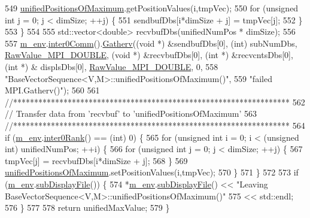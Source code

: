 \begin{DoxyCode}
549     \hyperlink{class_q_u_e_s_o_1_1_base_vector_sequence_a4269482101b2bcdb1975543f8191ab4c}{unifiedPositionsOfMaximum}.getPositionValues(i,tmpVec);
550     \textcolor{keywordflow}{for} (\textcolor{keywordtype}{unsigned} \textcolor{keywordtype}{int} j = 0; j < dimSize; ++j) \{
551       sendbufDbs[i*dimSize + j] = tmpVec[j];
552     \}
553   \}
554 
555   std::vector<double> recvbufDbs(unifiedNumPos * dimSize);
556 
557   \hyperlink{class_q_u_e_s_o_1_1_base_vector_sequence_a8e8824d2a63c5a43bcc6473e3a0491e8}{m\_env}.\hyperlink{class_q_u_e_s_o_1_1_base_environment_a689e4d140c74d495d97eb498714a4b82}{inter0Comm}().\hyperlink{class_q_u_e_s_o_1_1_mpi_comm_a9313449240c1bb2289870309a5c711ed}{Gatherv}((\textcolor{keywordtype}{void} *) &sendbufDbs[0], (\textcolor{keywordtype}{int}) subNumDbs, 
      \hyperlink{_mpi_comm_8h_ad0f503bd9fecfe4e570ca3d15aaf2518}{RawValue\_MPI\_DOUBLE}, (\textcolor{keywordtype}{void} *) &recvbufDbs[0], (\textcolor{keywordtype}{int} *) &recvcntsDbs[0], (\textcolor{keywordtype}{int} *) &
      displsDbs[0], \hyperlink{_mpi_comm_8h_ad0f503bd9fecfe4e570ca3d15aaf2518}{RawValue\_MPI\_DOUBLE}, 0,
558                              \textcolor{stringliteral}{"BaseVectorSequence<V,M>::unifiedPositionsOfMaximum()"},
559                              \textcolor{stringliteral}{"failed MPI.Gatherv()"});
560 
561   \textcolor{comment}{//******************************************************************}
562   \textcolor{comment}{// Transfer data from 'recvbuf' to 'unifiedPositionsOfMaximum'}
563   \textcolor{comment}{//******************************************************************}
564   \textcolor{keywordflow}{if} (\hyperlink{class_q_u_e_s_o_1_1_base_vector_sequence_a8e8824d2a63c5a43bcc6473e3a0491e8}{m\_env}.\hyperlink{class_q_u_e_s_o_1_1_base_environment_ae106b5bb8a80b655b88b3a26b1e7c185}{inter0Rank}() == (int) 0) \{
565     \textcolor{keywordflow}{for} (\textcolor{keywordtype}{unsigned} \textcolor{keywordtype}{int} i = 0; i < (\textcolor{keywordtype}{unsigned} int) unifiedNumPos; ++i) \{
566       \textcolor{keywordflow}{for} (\textcolor{keywordtype}{unsigned} \textcolor{keywordtype}{int} j = 0; j < dimSize; ++j) \{
567         tmpVec[j] = recvbufDbs[i*dimSize + j];
568       \}
569       \hyperlink{class_q_u_e_s_o_1_1_base_vector_sequence_a4269482101b2bcdb1975543f8191ab4c}{unifiedPositionsOfMaximum}.setPositionValues(i,tmpVec);
570     \}
571   \}
572 
573   \textcolor{keywordflow}{if} (\hyperlink{class_q_u_e_s_o_1_1_base_vector_sequence_a8e8824d2a63c5a43bcc6473e3a0491e8}{m\_env}.\hyperlink{class_q_u_e_s_o_1_1_base_environment_a8a0064746ae8dddfece4229b9ad374d6}{subDisplayFile}()) \{
574     *\hyperlink{class_q_u_e_s_o_1_1_base_vector_sequence_a8e8824d2a63c5a43bcc6473e3a0491e8}{m\_env}.\hyperlink{class_q_u_e_s_o_1_1_base_environment_a8a0064746ae8dddfece4229b9ad374d6}{subDisplayFile}() << \textcolor{stringliteral}{"Leaving
       BaseVectorSequence<V,M>::unifiedPositionsOfMaximum()"}
575                             << std::endl;
576   \}
577 
578   \textcolor{keywordflow}{return} unifiedMaxValue;
579 \}
\end{DoxyCode}
